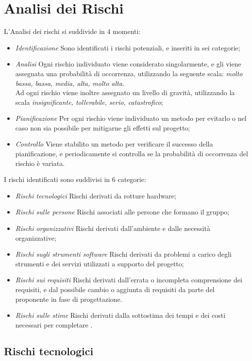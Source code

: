 \section{Analisi dei Rischi}
L'Analisi dei rischi si suddivide in 4 momenti:
\begin{itemize}
\item \textit{Identificazione} Sono identificati i rischi potenziali, e inseriti in sei categorie;
\item \textit{Analisi} Ogni rischio individuato viene considerato singolarmente, e gli viene assegnata una probabilità di occorrenza, utilizzando la seguente scala: \textit{molto bassa, bassa, media, alta, molto alta}. \\
Ad ogni rischio viene inoltre assegnato un livello di gravità, utilizzando la scala \textit{insignificante, tollerabile, serio, catastrofico};
\item \textit{Pianificazione} Per ogni rischio viene individuato un metodo per evitarlo o nel caso non sia possibile per mitigarne gli effetti sul progetto;
\item \textit{Controllo} Viene stabilito un metodo per verificare il successo della pianificazione, e periodicamente si controlla se la probabilità di occorrenza del rischio è variata.
\end{itemize}

I rischi identificati sono suddivisi in 6 categorie:
\begin{itemize}
\item \textit{Rischi tecnologici} Rischi derivati da rotture hardware;
\item \textit{Rischi sulle persone} Rischi associati alle persone che formano il gruppo;
\item \textit{Rischi organizzativi} Rischi derivati dall'ambiente e dalle necessità organizzative;
\item \textit{Rischi sugli strumenti software} Rischi derivati da problemi a carico degli strumenti e dei servizi utilizzati a supporto del progetto;
\item \textit{Rischi sui requisiti} Rischi derivati dall'errata o incompleta comprensione dei requisiti, e dal possibile cambio o aggiunta di requisiti da parte del proponente in fase di progettazione.
\item \textit{Rischi sulle stime} Rischi derivati dalla sottostima dei tempi e dei costi necessari per completare \ProjectName{}.
\end{itemize}

	\subsection{Rischi tecnologici}
	
